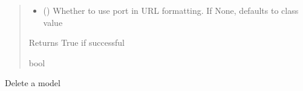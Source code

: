 \documentclass[letterpaper,10pt,english]{sphinxmanual}
\begin{document}
\begin{fulllineitems}
\begin{fulllineitems}
\begin{quote}
\begin{description}
\begin{itemize}
\item {} 
\sphinxAtStartPar
{} (\sphinxstyleliteralemphasis{\sphinxupquote{ (}}\sphinxstyleliteralemphasis{\sphinxupquote{)}}) \textendash{} Whether to use port in URL formatting. If None, defaults to class value

\end{itemize}

\sphinxAtStartPar
{} \textendash{} Returns True if successful

\sphinxAtStartPar
bool

\end{description}\end{quote}

\end{fulllineitems}


\begin{fulllineitems}
\label{\detokenize{aisquared.platform:aisquared.platform.AISquaredPlatformClient.AISquaredPlatformClient.delete_model}}
\pysigstartsignatures
{}
\pysigstopsignatures
\sphinxAtStartPar
Delete a model


\end{fulllineitems}
\end{fulllineitems}
\end{document}
